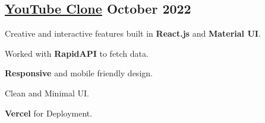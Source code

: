 \subsection{{\href{https://youtubee.vercel.app/}{YouTube Clone} \hfill October 2022}}
\begin{zitemize}
\item Creative and interactive features built in \textbf{React.js} and \textbf{Material UI}.
\item  Worked with \textbf{RapidAPI} to fetch data.
\item  \textbf{Responsive} and mobile friendly design.
\item Clean and Minimal UI.
\item \textbf{Vercel} for Deployment.
\end{zitemize}





